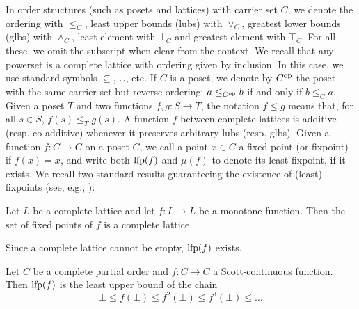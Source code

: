 In order structures (such as posets and lattices) with carrier set $C$, we denote the ordering with $\le_C$, least upper bounds (lubs) with $\vee_C$, greatest lower bounds (glbs) with $\wedge_C$, least element with $\bot_C$ and greatest element with $\top_C$. For all these, we omit the subscript when clear from the context.
We recall that any powerset is a complete lattice with ordering given by inclusion. In this case, we use standard symbols $\subseteq$, $\cup$, etc.
If $C$ is a poset, we denote by $C^{\text{op}}$ the poset with the same carrier set but reverse ordering: $a \le_{C^{\text{op}}} b$ if and only if $b \le_C a$.
Given a poset $T$ and two functions $f, g: S \rightarrow T$, the notation $f \le g$ means that, for all $s \in S$, $f(s) \le_T g(s)$.
A function $f$ between complete lattices is additive (resp. co-additive) whenever it preserves arbitrary lubs (resp. glbs).
Given a function $f : C \rightarrow C$ on a poset $C$, we call a point $x \in C$ a fixed point (or fixpoint) if $f(x) = x$, and write both $\text{lfp}(f)$ and $\mu(f)$ to denote its least fixpoint, if it exists. We recall two standard results guaranteeing the existence of (least) fixpoints (see, e.g., \cite{DP02}):
\begin{theorem}
	Let $L$ be a complete lattice and let $f: L \rightarrow L$ be a monotone function. Then the set of fixed points of $f$ is a complete lattice.
\end{theorem}
\begin{corollary}
	Since a complete lattice cannot be empty, $\text{lfp}(f)$ exists.
\end{corollary}
\begin{theorem}[Kleene]
	Let $C$ be a complete partial order and $f : C \rightarrow C$ a Scott-continuous function. Then $\text{lfp}(f)$ is the least upper bound of the chain
	\[
	\bot \le f(\bot) \le f^2(\bot) \le f^3(\bot) \le \dots
	\]
\end{theorem}

